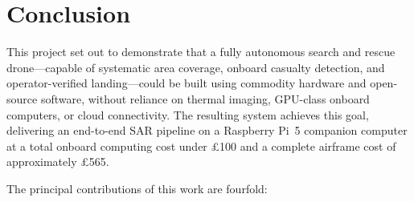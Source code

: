 \section{Conclusion}\label{sec:conclusion}

This project set out to demonstrate that a fully autonomous search and rescue drone---capable of systematic area coverage, onboard casualty detection, and operator-verified landing---could be built using commodity hardware and open-source software, without reliance on thermal imaging, GPU-class onboard computers, or cloud connectivity. The resulting system achieves this goal, delivering an end-to-end SAR pipeline on a Raspberry Pi~5 companion computer at a total onboard computing cost under \pounds100 and a complete airframe cost of approximately \pounds565.

The principal contributions of this work are fourfold:

